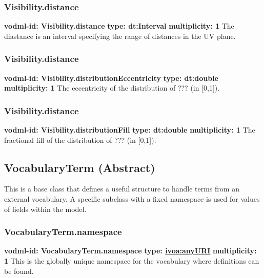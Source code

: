     \subsubsection{Visibility.distance}
      \textbf{vodml-id: Visibility.distance} \newline
      \textbf{type: dt:Interval} \newline
      \textbf{multiplicity: 1} \newline
      The diastance is an interval specifying the range of distances in the UV plane.

    \subsubsection{Visibility.distance}
      \textbf{vodml-id: Visibility.distributionEccentricity} \newline
      \textbf{type: dt:double} \newline
      \textbf{multiplicity: 1} \newline
      The eccentricity of the distribution of ??? (in [0,1]).

    \subsubsection{Visibility.distance}
      \textbf{vodml-id: Visibility.distributionFill} \newline
      \textbf{type: dt:double} \newline
      \textbf{multiplicity: 1} \newline
      The fractional fill of the distribution of ??? (in [0,1]).

  \subsection{VocabularyTerm (Abstract)}
  \label{sect:VocabularyTerm}
    This is a base class that defines a useful structure to handle terms from an external vocabulary. A specific subclass with a fixed namespace is used for values of fields within the model. 

    \subsubsection{VocabularyTerm.namespace}
      \textbf{vodml-id: VocabularyTerm.namespace} \newline
      \textbf{type: \hyperref[sect:ivoa]{ivoa:anyURI}} \newline
      \textbf{multiplicity: 1} \newline
      This is the globally unique namespace for the vocabulary where definitions can be found.

